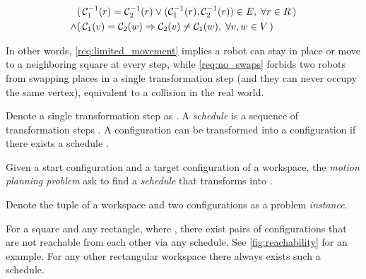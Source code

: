 \begin{align}
	& (\, \mathcal{C}_{1}^{-1}(r) = \mathcal{C}_{2}^{-1}(r) \lor (\mathcal{C}_{1}^{-1}(r), \mathcal{C}_{2}^{-1}(r)) \in E, \; \forall r \in R \,)\label{req:limited_movement}\\
	\land & (\, \mathcal{C}_{1}(v) = \mathcal{C}_{2}(w) \Rightarrow \mathcal{C}_{2}(v) \neq \mathcal{C}_{1}(w), \; \forall v, w \in V \,)\label{req:no_swaps}
\end{align}

In other words, \cref{req:limited_movement} implies  a robot can stay in place or move to a neighboring square at every step, while \cref{req:no_swaps} forbids two robots from swapping places in a single transformation step (and they can never occupy the same vertex), equivalent to a collision in the real world.

Denote a single transformation step as  . 
A \emph{schedule} is a sequence of transformation steps . 
A configuration  can be transformed into a configuration  if there exists a schedule .

\begin{definition}\label{def:motion_planning_problem}
	Given a start configuration  and a target configuration  of a workspace, the \emph{motion planning problem} ask  to find a \emph{schedule}  that transforms  into .
\end{definition}

Denote the tuple of a workspace and two configurations  as a problem \emph{instance}. 

\begin{remark}\label{remark:reachability}
	For a  square and any  rectangle, where , there exist pairs of configurations that are not reachable from each other via any schedule. 
	See \cref{fig:reachability} for an example. For any other rectangular workspace there always exists such a schedule. 
\end{remark}

